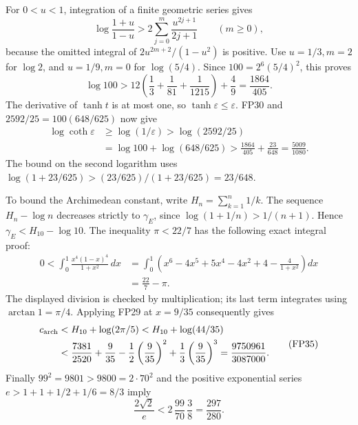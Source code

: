 \documentclass[11pt,a4paper]{article}
\theoremstyle{definition}\newtheorem{definition}[theorem]{Definition}
\begin{document}
For \(0<u<1\), integration of a finite geometric series gives
\[
 \log\frac{1+u}{1-u}
 >2\sum_{j=0}^m\frac{u^{2j+1}}{2j+1}\qquad(m\ge0),
 \tag{FP31}\label{fp:fpb:log-lower}
\]
because the omitted integral of
\(2u^{2m+2}/(1-u^2)\) is positive.
Use \(u=1/3,m=2\) for \(\log2\), and \(u=1/9,m=0\) for
\(\log(5/4)\). Since \(100=2^6(5/4)^2\), this proves
\[
 \log100>
 12\left(\frac13+\frac1{81}+\frac1{1215}\right)+\frac49
 =\frac{1864}{405}.
 \tag{FP32}
\]
The derivative of \(\tanh t\) is at most one, so
\(\tanh\varepsilon\le\varepsilon\). FP30 and
\(2592/25=100(648/625)\) now give
\[
 \begin{aligned}
 \log\coth\varepsilon
 &\ge\log(1/\varepsilon)>\log(2592/25)\\
 &=\log100+\log(648/625)
 >\frac{1864}{405}+\frac{23}{648}
 =\frac{5009}{1080}.
 \end{aligned}
 \tag{FP33}\label{fp:fpb:coth-two}
\]
The bound on the second logarithm uses
\(\log(1+23/625)>(23/625)/(1+23/625)=23/648\).

To bound the Archimedean constant, write
\(H_n=\sum_{k=1}^n1/k\). The sequence \(H_n-\log n\) decreases
strictly to \(\gamma_E\), since
\(\log(1+1/n)>1/(n+1)\). Hence
\(\gamma_E<H_{10}-\log10\).
The inequality \(\pi<22/7\) has the following exact integral proof:
\[
 \begin{aligned}
 0<\int_0^1\frac{x^4(1-x)^4}{1+x^2}\,dx
 &=\int_0^1\left(x^6-4x^5+5x^4-4x^2+4
                              -\frac4{1+x^2}\right)dx\\
 &=\frac{22}{7}-\pi.
 \end{aligned}
 \tag{FP34}
\]
The displayed division is checked by multiplication; its last
term integrates using \(\arctan1=\pi/4\).
Applying FP29 at \(x=9/35\) consequently gives
\[
 \begin{aligned}
 c_{\rm arch}
 &<H_{10}+\log(2\pi/5)
 <H_{10}+\log(44/35)\\
 &<\frac{7381}{2520}
       +\frac9{35}-\frac12\left(\frac9{35}\right)^2
                     +\frac13\left(\frac9{35}\right)^3
 =\frac{9750961}{3087000}.
 \end{aligned}
 \tag{FP35}\label{fp:fpb:carch}
\]
Finally \(99^2=9801>9800=2\cdot70^2\) and the positive
exponential series \(e>1+1+1/2+1/6=8/3\) imply
\[
 \frac{2\sqrt2}{e}
 <2\,\frac{99}{70}\,\frac38=\frac{297}{280}.
 \tag{FP36}\label{fp:fpb:sqrt-two}
\]
\end{document}
